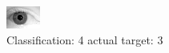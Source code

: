 \begin{figure}[h!]
\begin{center}
\includegraphics[width=0.60\columnwidth]{figures/ID2126_class_4_target_3.png}
\end{center}
\caption{ Classification: 4 actual target: 3}
\label{fig:ID2126_class_4_target_3}
\end{figure}
